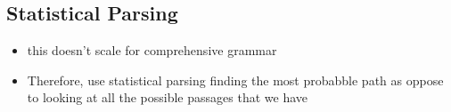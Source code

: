 \documentclass[11pt]{article}
\begin{document}
\begin{figure}[H]
    \centering
\end{figure}    

\subsection{Statistical Parsing}

\begin{minipage}[l]{.5\linewidth}
    \begin{figure}[H]
        \centering
    \end{figure}    
\end{minipage}\hfill
\begin{minipage}[r]{.48\linewidth}
    \begin{itemize}
        \item this doesn't scale for comprehensive grammar
        \item Therefore, use statistical parsing finding the most probabble path as oppose to looking at all the possible passages that we have
    \end{itemize}
\end{minipage}
\end{document}
